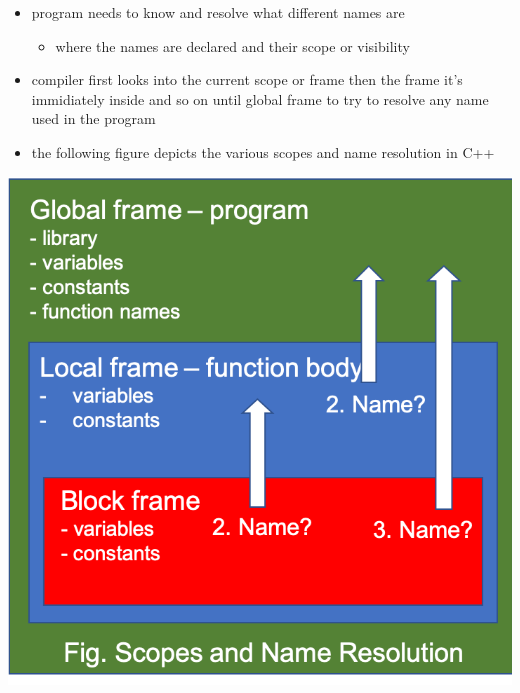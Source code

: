 \documentclass[11pt]{article}
\providecommand{\tightlist}{%
      \setlength{\itemsep}{0pt}\setlength{\parskip}{0pt}}
\begin{document}
\begin{itemize}
\item
  program needs to know and resolve what different names are

  \begin{itemize}
  \tightlist
  \item
    where the names are declared and their scope or visibility
  \end{itemize}
\item
  compiler first looks into the current scope or frame then the frame
  it's immidiately inside and so on until global frame to try to resolve
  any name used in the program
\item
  the following figure depicts the various scopes and name resolution in
  C++
\end{itemize}

\includegraphics{resources/scopesandnameresolution.png}
\end{document}
